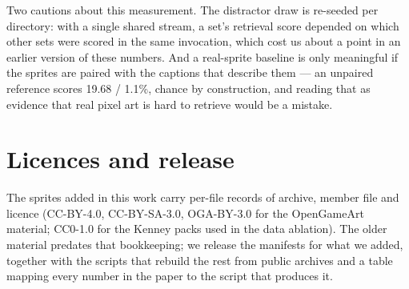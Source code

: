 \documentclass[10pt,twocolumn,letterpaper]{article}
\begin{document}
Two cautions about this measurement. The distractor draw is re-seeded per directory: with a single shared stream, a
set's retrieval score depended on which other sets were scored in the same invocation, which cost us about a point in
an earlier version of these numbers. And a real-sprite baseline is only meaningful if the sprites are paired with the
captions that describe them --- an unpaired reference scores 19.68 / 1.1\%, chance by construction, and reading that
as evidence that real pixel art is hard to retrieve would be a mistake.

\section{Licences and release}
\label{sup:licence}

The sprites added in this work carry per-file records of archive, member file and licence (CC-BY-4.0, CC-BY-SA-3.0,
OGA-BY-3.0 for the OpenGameArt material; CC0-1.0 for the Kenney packs used in the data ablation). The older material
predates that bookkeeping; we release the manifests for what we added, together with the scripts that rebuild the rest
from public archives and a table mapping every number in the paper to the script that produces it.
\end{document}
